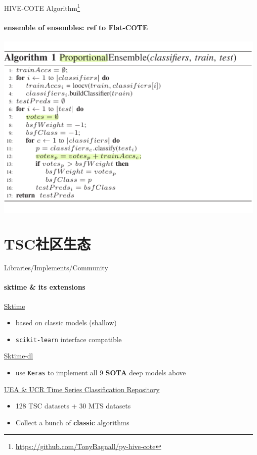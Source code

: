 \documentclass[aspectratio=169]{ctexbeamer}
\begin{document}
\begin{frame}{HIVE-COTE Algorithm\footnote{\url{https://github.com/TonyBagnall/py-hive-cote}}}
	\framesubtitle{ensemble of ensembles: ref to Flat-COTE}
	\begin{center}
		\includegraphics[width=.7\textwidth]{figure/flat_cote_algo}
	\end{center}

\end{frame}

\section{TSC社区生态}

\begin{frame}{Libraries/Implements/Community}
  \framesubtitle{sktime \& its extensions}
  \href{https://github.com/alan-turing-institute/sktime}{\Large{Sktime}}
  \begin{itemize}
    \item based on classic models (shallow)
    \item \texttt{scikit-learn} interface compatible
  \end{itemize}
  \href{https://github.com/sktime/sktime-dl}{\Large{Sktime-dl}}
  \begin{itemize}
    \item use \texttt{Keras} to implement all 9 \textbf{SOTA} deep models above
  \end{itemize}
  \href{http://www.timeseriesclassification.com/}{\Large{UEA \& UCR Time Series Classification Repository}}
  \begin{itemize}
    \item 128 TSC datasets + 30 MTS datasets
    \item Collect a bunch of \textbf{classic} algorithms
  \end{itemize}
\end{frame}
\end{document}
